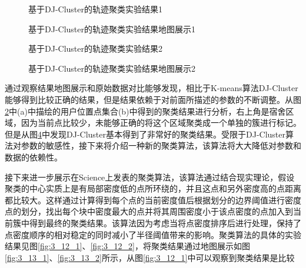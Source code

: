 \begin{figure}[htb]
  \centering%
  \hspace{4em}%
  \caption{基于DJ-Cluster的轨迹聚类实验结果1}
  \label{fig:3_10_1}
\end{figure}
\begin{figure}[htb]
  \centering%
  \hspace{4em}%
  \caption{基于DJ-Cluster的轨迹聚类实验结果地图展示1}
  \label{fig:3_11_1}
\end{figure}
\begin{figure}[htb]
  \centering%
  \hspace{4em}%
  \caption{基于DJ-Cluster的轨迹聚类实验结果2}
  \label{fig:3_10_2}
\end{figure}
\begin{figure}[htb]
  \centering%
  \hspace{4em}%
  \caption{基于DJ-Cluster的轨迹聚类实验结果地图展示2}
  \label{fig:3_11_2}
\end{figure}
\par 通过观察结果地图展示和原始数据对比能够发现，相比于K-means算法DJ-Cluster能够得到比较正确的结果，但是结果依赖于对前面所描述的参数的不断调整。从图\ref{fig:3_11_1}中(a)中描绘的用户位置点集合(b)中得到的聚类结果进行分析，右上角是宿舍区域，因为当前点比较少，未能够正确的将这个区域聚类成一个单独的簇进行标记。但是从图\ref{fig:3_11_2}中发现DJ-Cluster基本得到了非常好的聚类结果。受限于DJ-Cluster算法对参数的敏感性，接下来将介绍一种新的聚类算法，该算法将大大降低对参数和数据的依赖性。
\par 接下来进一步展示在Science上发表的聚类算法，该算法通过结合现实理论，假设聚类的中心实质上是有局部密度低的点所环绕的，并且这点和另外密度高的点距离都比较大。这样通过计算得到每个点的当前密度值后根据划分的边界阈值进行密度点的划分，找出每个块中密度最大的点并将其周围密度小于该点密度的点加入到当前簇中得到最终的聚类结果。该算法因为考虑当将点密度排序后进行处理，保持了点密度顺序的相对稳定的同时减小了半径阈值带来的影响。聚类算法的具体的实验结果见图\ref{fig:3_12_1}、\ref{fig:3_12_2}，将聚类结果通过地图展示如图\ref{fig:3_13_1}、\ref{fig:3_13_2}所示，从图\ref{fig:3_12_1}中可以观察到聚类结果是比较
